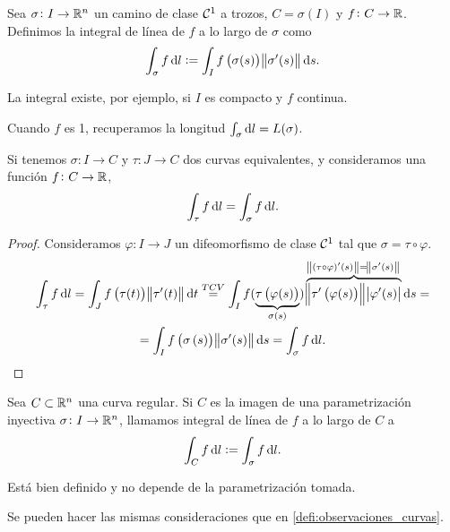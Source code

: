 \begin{defi}
    Sea $\sigma \colon I \to \mathbb{R}^n$ un camino de clase $\mathcal{C}^1$ a trozos, $C = \sigma(I)$ y $f \colon C \to \mathbb{R}$. Definimos
    la integral de línea de $f$ a lo largo de $\sigma$ como
    \[
        \int_\sigma f \dif l := \int_I f\left( \sigma(s) \right) \norm{\sigma^\prime(s)} \dif s.
    \]

    La integral existe, por ejemplo, si $I$ es compacto y $f$ continua.
\end{defi}

\begin{obs*}
    Cuando $f$ es 1, recuperamos la longitud $\int_\sigma \dif l = L(\sigma)$.
\end{obs*}

\begin{prop}
    Si tenemos $\sigma \colon I \to C$ y $\tau \colon J \to C$ dos curvas equivalentes, y consideramos una función $f \colon C \to \mathbb{R}$,
    \[
        \int_\tau f \dif l = \int_\sigma f \dif l.
    \]
\end{prop}

\begin{proof}
    Consideramos $\varphi \colon I \to J$ un difeomorfismo de clase $\mathcal{C}^1$ tal que $\sigma = \tau \circ \varphi$.
    \begin{gather*}
        \int_\tau f \dif l = \int_J f\left( \tau(t) \right) \norm{\tau^\prime(t)} \dif t \stackrel{TCV}{=}
        \int_I f( \underbrace{\tau\left( \varphi(s) \right)}_{\sigma(s)} ) \overbrace{\norm{\tau^\prime\left( \varphi(s) \right)}
        \abs{\varphi^\prime(s)}}^{\norm{(\tau \circ \varphi)^\prime (s)} = \norm{\sigma^\prime (s)}} \dif s= \\
        = \int_I f\left( \sigma\left( s \right) \right) \norm{\sigma^\prime(s)} \dif s = \int_\sigma f \dif l.
    \end{gather*}
\end{proof}

\begin{defi}
    Sea $C \subset \mathbb{R}^n$ una curva regular. Si $C$ es la imagen de una parametrización inyectiva $\sigma \colon I \to \mathbb{R}^n$,
    llamamos integral de línea de $f$ a lo largo de $C$ a
    \[
        \int_C f \dif l := \int_\sigma f \dif l.
    \]
\end{defi}

\begin{obs*}
    Está bien definido y no depende de la parametrización tomada.
\end{obs*}
\begin{obs*}
    Se pueden hacer las mismas consideraciones que en \ref{defi:observaciones_curvas}.
\end{obs*}

